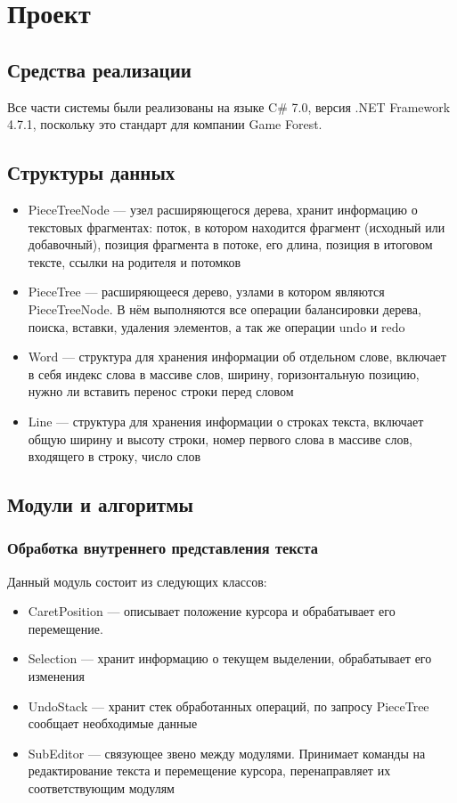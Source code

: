\documentclass{fefu}
\begin{document}
	\section{Проект}
		\subsection{Средства реализации}
			Все части системы были реализованы на языке C\# 7.0, 
			версия .NET Framework 4.7.1, поскольку это стандарт для компании Game Forest.
		\subsection{Структуры данных}
			\begin{itemize}
				\item PieceTreeNode --- узел расширяющегося дерева, хранит информацию о 
				текстовых фрагментах: поток, в котором находится фрагмент (исходный или
				добавочный), позиция фрагмента в потоке, его длина, позиция в итоговом 
				тексте, ссылки на родителя и потомков
				\item PieceTree --- расширяющееся дерево, узлами в котором являются
				PieceTreeNode. В нём выполняются все операции балансировки дерева, поиска,
				вставки, удаления элементов, а так же операции undo и redo
				\item Word --- структура для хранения информации об отдельном слове, включает в
				себя индекс слова в массиве слов, ширину, горизонтальную позицию, нужно ли
				вставить перенос строки перед словом
				\item Line --- структура для хранения информации о строках текста, включает
				общую ширину и высоту строки, номер первого слова в массиве слов, входящего в
				строку, число слов
			\end{itemize}
		\subsection{Модули и алгоритмы}
			\subsubsection{Обработка внутреннего представления текста}
				\par Данный модуль состоит из следующих классов:
				\begin{itemize}
					\item CaretPosition --- описывает положение курсора и 
					обрабатывает его перемещение.
					\item Selection --- хранит информацию о текущем выделении, обрабатывает его
					изменения
					\item UndoStack --- хранит стек обработанных операций, по запросу PieceTree 
					сообщает необходимые данные 
					\item SubEditor --- связующее звено между модулями. Принимает команды на 
					редактирование текста и перемещение курсора, перенаправляет их
					соответствующим модулям
				\end{itemize}
\end{document}

